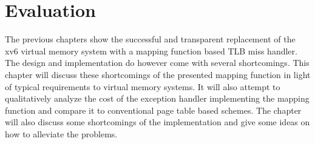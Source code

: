 \chapter{Evaluation}
\label{chap:eval}










The previous chapters show the successful and transparent replacement of the xv6 virtual memory system with a mapping function based TLB miss handler. The design and implementation do however come with several shortcomings.
This chapter will discuss these shortcomings of the presented mapping function in light of typical requirements to virtual memory systems. It will also attempt to qualitatively analyze the cost of the exception handler implementing the mapping function and compare it to conventional page table based schemes. The chapter will also discuss some shortcomings of the implementation and give some ideas on how to alleviate the problems.

